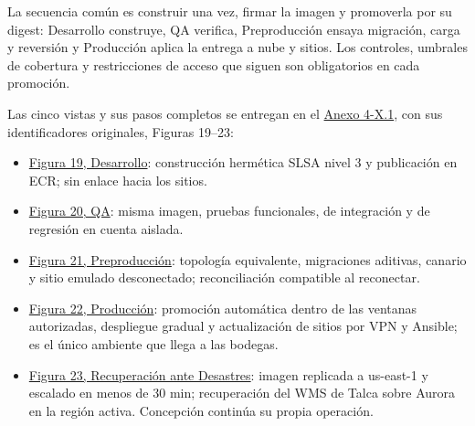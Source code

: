 La secuencia común es construir una vez, firmar la imagen y promoverla por su digest: Desarrollo construye, QA verifica, Preproducción ensaya migración, carga y reversión y Producción aplica la entrega a nube y sitios. Los controles, umbrales de cobertura y restricciones de acceso que siguen son obligatorios en cada promoción.

Las cinco vistas y sus pasos completos se entregan en el \href{LAFROX-Subdocumento4-Anexos.pdf#anx:X-ambientes}{Anexo 4-X.1}, con sus identificadores originales, Figuras 19--23:
\begin{itemize}
  \item \hypertarget{fig:amb-desarrollo}{}\href{LAFROX-Subdocumento4-Anexos.pdf#fig:amb-desarrollo}{Figura 19, Desarrollo}: construcción hermética SLSA nivel 3 y publicación en ECR; sin enlace hacia los sitios.
  \item \hypertarget{fig:amb-qa}{}\href{LAFROX-Subdocumento4-Anexos.pdf#fig:amb-qa}{Figura 20, QA}: misma imagen, pruebas funcionales, de integración y de regresión en cuenta aislada.
  \item \hypertarget{fig:amb-preproduccion}{}\href{LAFROX-Subdocumento4-Anexos.pdf#fig:amb-preproduccion}{Figura 21, Preproducción}: topología equivalente, migraciones aditivas, canario y sitio emulado desconectado; reconciliación compatible al reconectar.
  \item \hypertarget{fig:amb-produccion}{}\href{LAFROX-Subdocumento4-Anexos.pdf#fig:amb-produccion}{Figura 22, Producción}: promoción automática dentro de las ventanas autorizadas, despliegue gradual y actualización de sitios por VPN y Ansible; es el único ambiente que llega a las bodegas.
  \item \hypertarget{fig:amb-recuperacion}{}\href{LAFROX-Subdocumento4-Anexos.pdf#fig:amb-recuperacion}{Figura 23, Recuperación ante Desastres}: imagen replicada a us-east-1 y escalado en menos de 30 min; recuperación del WMS de Talca sobre Aurora en la región activa. Concepción continúa su propia operación.
\end{itemize}
\addtocounter{figure}{5}

